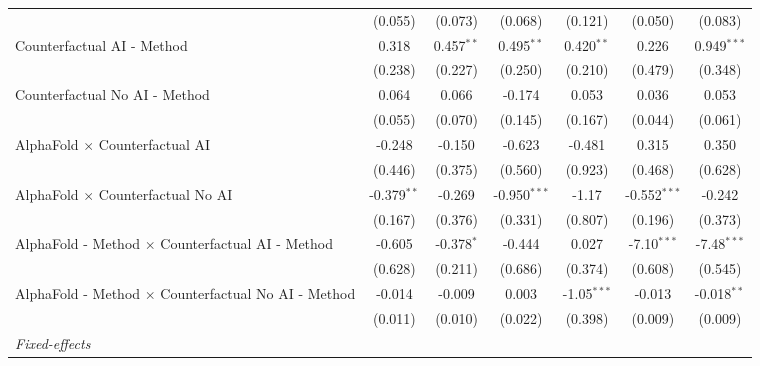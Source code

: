\begin{tabular}{lcccccc}
                                                              & (0.055)       & (0.073)      & (0.068)        & (0.121)       & (0.050)        & (0.083)\\   
   Counterfactual AI - Method                                 & 0.318         & 0.457$^{**}$ & 0.495$^{**}$   & 0.420$^{**}$  & 0.226          & 0.949$^{***}$\\   
                                                              & (0.238)       & (0.227)      & (0.250)        & (0.210)       & (0.479)        & (0.348)\\   
   Counterfactual No AI - Method                              & 0.064         & 0.066        & -0.174         & 0.053         & 0.036          & 0.053\\   
                                                              & (0.055)       & (0.070)      & (0.145)        & (0.167)       & (0.044)        & (0.061)\\   
   AlphaFold $\times$ Counterfactual AI                       & -0.248        & -0.150       & -0.623         & -0.481        & 0.315          & 0.350\\   
                                                              & (0.446)       & (0.375)      & (0.560)        & (0.923)       & (0.468)        & (0.628)\\   
   AlphaFold $\times$ Counterfactual No AI                    & -0.379$^{**}$ & -0.269       & -0.950$^{***}$ & -1.17         & -0.552$^{***}$ & -0.242\\   
                                                              & (0.167)       & (0.376)      & (0.331)        & (0.807)       & (0.196)        & (0.373)\\   
   AlphaFold - Method $\times$ Counterfactual AI - Method     & -0.605        & -0.378$^{*}$ & -0.444         & 0.027         & -7.10$^{***}$  & -7.48$^{***}$\\   
                                                              & (0.628)       & (0.211)      & (0.686)        & (0.374)       & (0.608)        & (0.545)\\   
   AlphaFold - Method $\times$ Counterfactual No AI - Method  & -0.014        & -0.009       & 0.003          & -1.05$^{***}$ & -0.013         & -0.018$^{**}$\\   
                                                              & (0.011)       & (0.010)      & (0.022)        & (0.398)       & (0.009)        & (0.009)\\   
   \midrule
   \emph{Fixed-effects}\\

\end{tabular}
